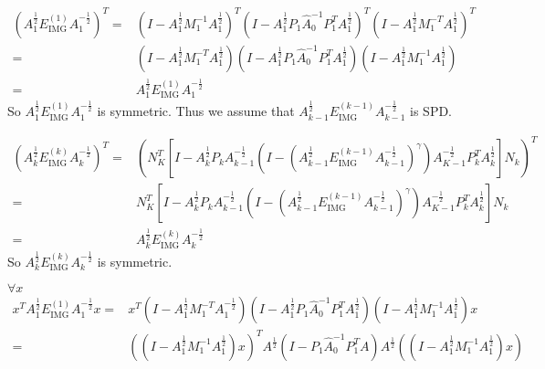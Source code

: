 \documentclass{article}
\begin{document}
\begin{equation*}
    \begin{aligned}
        (A_1^{\frac{1}{2}}E_\text{IMG}^{(1)}A_1^{-\frac{1}{2}})^T
        = & (I-A_1^{\frac{1}{2}}M_1^{-1}A_1^{\frac{1}{2}})^T(I-A_1^{\frac{1}{2}}P_1\hat{A}_0^{-1}P_1^TA_1^{\frac{1}{2}})^T(I-A_1^{\frac{1}{2}}M_1^{-T}A_1^{\frac{1}{2}})^T \\
        = & (I-A_1^{\frac{1}{2}}M_1^{-T}A_1^{\frac{1}{2}})(I-A_1^{\frac{1}{2}}P_1\hat{A}_0^{-1}P_1^TA_1^{\frac{1}{2}})(I-A_1^{\frac{1}{2}}M_1^{-1}A_1^{\frac{1}{2}})       \\
        = & A_1^{\frac{1}{2}}E_\text{IMG}^{(1)}A_1^{-\frac{1}{2}}
    \end{aligned}
\end{equation*}
So $A_1^{\frac{1}{2}}E_\text{IMG}^{(1)}A_1^{-\frac{1}{2}}$ is symmetric. Thus we assume that $A_{k-1}^{\frac{1}{2}}E_\text{IMG}^{(k-1)}A_{k-1}^{-\frac{1}{2}}$ is SPD.

\begin{equation*}
    \begin{aligned}
        (A_k^{\frac{1}{2}}E_\text{IMG}^{(k)}A_k^{-\frac{1}{2}})^T= & (N_K^T[I-A_k^{\frac{1}{2}}P_kA_{k-1}^{-\frac{1}{2}}(I-(A_{k-1}^{\frac{1}{2}}E_\text{IMG}^{(k-1)}A_{k-1}^{-\frac{1}{2}})^\gamma)A_{K-1}^{-\frac{1}{2}}P_k^TA_k^{\frac{1}{2}}]N_k)^T \\
        =                                                          & N_K^T[I-A_k^{\frac{1}{2}}P_kA_{k-1}^{-\frac{1}{2}}(I-(A_{k-1}^{\frac{1}{2}}E_\text{IMG}^{(k-1)}A_{k-1}^{-\frac{1}{2}})^\gamma)A_{K-1}^{-\frac{1}{2}}P_k^TA_k^{\frac{1}{2}}]N_k     \\
        =                                                          & A_k^{\frac{1}{2}}E_\text{IMG}^{(k)}A_k^{-\frac{1}{2}}
    \end{aligned}
\end{equation*}
So $A_k^{\frac{1}{2}}E_\text{IMG}^{(k)}A_k^{-\frac{1}{2}}$ is symmetric.

$\forall x$
\begin{equation*}
    \begin{aligned}
        x^TA_1^{\frac{1}{2}}E_\text{IMG}^{(1)}A_1^{-\frac{1}{2}}x= & x^T (I-A_1^{\frac{1}{2}}M_1^{-T}A_1^{-\frac{1}{2}})(I-A_1^{\frac{1}{2}}P_1\hat{A}_0^{-1}P_1^TA_1^{ \frac{1}{2}})(I-A_1^{\frac{1}{2}}M_1^{-1}A_1^{\frac{1}{2}}) x  \\
        =                                                          & ((I-A_1^{\frac{1}{2}}M_1^{-1}A_1^{\frac{1}{2}}) x )^TA^{\frac{1}{2}}(I-P_1\hat{A}_0^{-1}P_1^TA)A^{\frac{1}{2}}((I-A_1^{\frac{1}{2}}M_1^{-1}A_1^{\frac{1}{2}}) x )
    \end{aligned}
\end{equation*}
\end{document}
